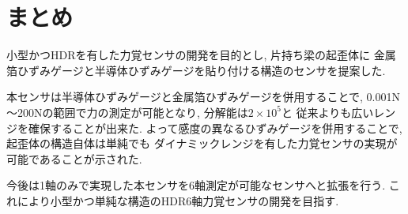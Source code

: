 \section{まとめ}
小型かつHDRを有した力覚センサの開発を目的とし, 片持ち梁の起歪体に
金属箔ひずみゲージと半導体ひずみゲージを貼り付ける構造のセンサを提案した. 

本センサは半導体ひずみゲージと金属箔ひずみゲージを併用することで, 
0.001N～200Nの範囲で力の測定が可能となり, 分解能は$2 × 10^{5}$と
従来よりも広いレンジを確保することが出来た. 
よって感度の異なるひずみゲージを併用することで, 起歪体の構造自体は単純でも
ダイナミックレンジを有した力覚センサの実現が可能であることが示された. 

今後は1軸のみで実現した本センサを6軸測定が可能なセンサへと拡張を行う. 
これにより小型かつ単純な構造のHDR6軸力覚センサの開発を目指す.